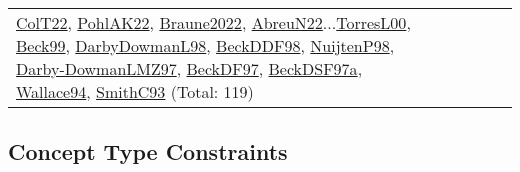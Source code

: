 {\begin{longtable}{p{3cm}r>{\raggedright\arraybackslash}p{6cm}>{\raggedright\arraybackslash}p{6cm}>{\raggedright\arraybackslash}p{8cm}}
\hyperref[detail:ColT22]{ColT22}, \hyperref[detail:PohlAK22]{PohlAK22}, \hyperref[detail:Braune2022]{Braune2022}, \hyperref[detail:AbreuN22]{AbreuN22}...\hyperref[detail:TorresL00]{TorresL00}, \hyperref[detail:Beck99]{Beck99}, \hyperref[detail:DarbyDowmanL98]{DarbyDowmanL98}, \hyperref[detail:BeckDDF98]{BeckDDF98}, \hyperref[detail:NuijtenP98]{NuijtenP98}, \hyperref[detail:Darby-DowmanLMZ97]{Darby-DowmanLMZ97}, \hyperref[detail:BeckDF97]{BeckDF97}, \hyperref[detail:BeckDSF97a]{BeckDSF97a}, \hyperref[detail:Wallace94]{Wallace94}, \hyperref[detail:SmithC93]{SmithC93} (Total: 119)\\
\end{longtable}
}

\clearpage
\subsection{Concept Type Constraints}
\label{sec:Constraints}
\label{Constraints}
